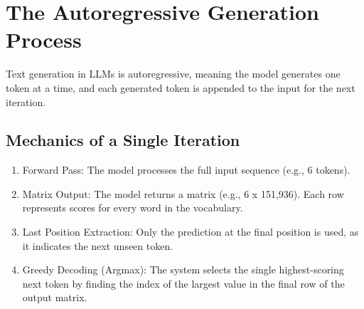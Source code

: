 ﻿\section{The Autoregressive Generation Process}
\label{sec:autoregressive-generation-process}


Text generation in LLMs is autoregressive, meaning the model generates one token at a time, and each generated token is appended to the input for the next iteration.

\subsection{Mechanics of a Single Iteration}

\begin{enumerate}
    \item Forward Pass: The model processes the full input sequence (e.g., 6 tokens).
    \item Matrix Output: The model returns a matrix (e.g., 6 x 151,936). Each row represents scores for every word in the vocabulary.
    \item Last Position Extraction: Only the prediction at the final position is used, as it indicates the next unseen token.
    \item Greedy Decoding (Argmax): The system selects the single highest-scoring next token by finding the index of the largest value in the final row of the output matrix.
\end{enumerate}